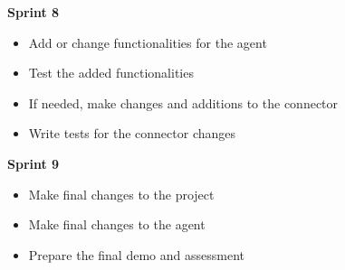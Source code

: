 \textbf{Sprint 8}

\begin{itemize}
  \item Add or change functionalities for the agent
  \item Test the added functionalities
  \item If needed, make changes and additions to the connector
  \item Write tests for the connector changes\\
\end{itemize}

\textbf{Sprint 9}

\begin{itemize}
  \item Make final changes to the project
  \item Make final changes to the agent
  \item Prepare the final demo and assessment\\
\end{itemize}

